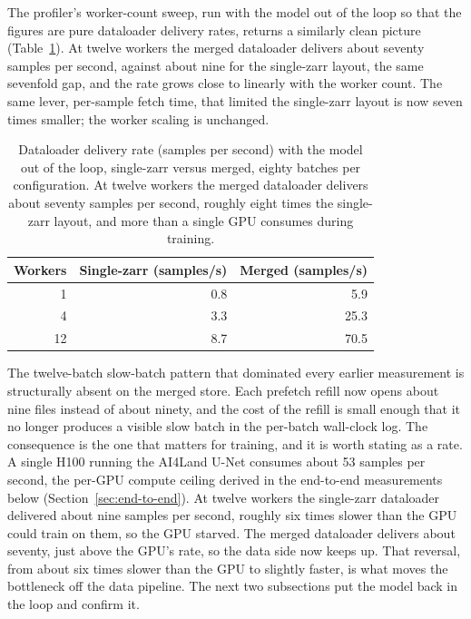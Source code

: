 \documentclass[12pt,a4paper]{article}
\begin{document}
The profiler's worker-count sweep, run with the model out of the loop so that the figures
are pure dataloader delivery rates, returns a similarly clean picture
(Table~\ref{tab:merged-workers}). At twelve workers the merged dataloader delivers about
seventy samples per second, against about nine for the single-zarr layout, the same sevenfold
gap, and the rate grows close to linearly with the worker count. The same lever, per-sample
fetch time, that limited the single-zarr layout is now seven times smaller; the worker
scaling is unchanged.

\begin{table}[ht]
\centering
\small
\begin{tabular}{@{}rrr@{}}
\toprule
\textbf{Workers} & \textbf{Single-zarr (samples/s)} & \textbf{Merged (samples/s)} \\
\midrule
 1 & 0.8 &  5.9 \\
 4 & 3.3 & 25.3 \\
12 & 8.7 & 70.5 \\
\bottomrule
\end{tabular}
\caption{Dataloader delivery rate (samples per second) with the model out of the loop,
single-zarr versus merged, eighty batches per configuration. At twelve workers the merged dataloader
delivers about seventy samples per second, roughly eight times the single-zarr layout, and
more than a single GPU consumes during training.}
\label{tab:merged-workers}
\end{table}

The twelve-batch slow-batch pattern that dominated every earlier measurement is
structurally absent on the merged store. Each prefetch refill now opens about nine files
instead of about ninety, and the cost of the refill is small enough that it no longer
produces a visible slow batch in the per-batch wall-clock log. The consequence is the one
that matters for training, and it is worth stating as a rate. A single H100 running the
AI4Land U-Net consumes about 53 samples per second, the per-GPU compute ceiling derived in the
end-to-end measurements below (Section~\ref{sec:end-to-end}). At twelve workers the single-zarr
dataloader delivered about nine samples per second, roughly six times slower than the GPU could
train on them, so the GPU starved. The merged dataloader delivers about seventy, just above the
GPU's rate, so the data side now keeps up. That reversal, from about six times slower than the
GPU to slightly faster, is what moves the bottleneck off the data pipeline. The next two
subsections put the model back in the loop and confirm it.
\end{document}
